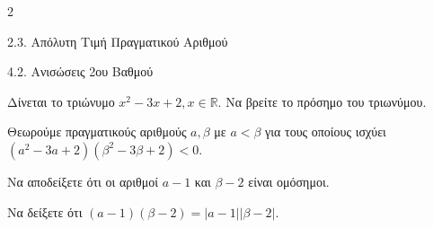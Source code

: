 \begin{ylh}{2}
    \item 2.3. Απόλυτη Τιμή Πραγματικού Αριθμού
    \item 4.2. Ανισώσεις 2ου Βαθμού
\end{ylh}

\begin{alist}
\item Δίνεται το τριώνυμο $x^2 - 3x + 2, x \in \mathbb{R}$. Να βρείτε το πρόσημο του τριωνύμου. 
\item Θεωρούμε πραγματικούς αριθμούς $a, \beta$ με $a < \beta$ για τους οποίους ισχύει $(a^2-3a+2)(\beta^2-3\beta+2) < 0$.

\begin{rlist}
\item Να αποδείξετε ότι οι αριθμοί $a - 1$ και $\beta - 2$ είναι ομόσημοι.
\item Να δείξετε ότι $(a - 1)(\beta - 2) = |a - 1||\beta - 2|$. 
\end{rlist}
\end{alist}

